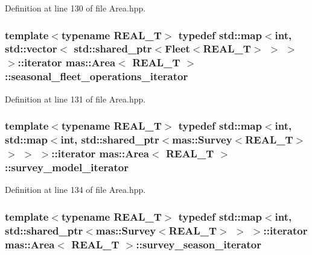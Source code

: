 Definition at line 130 of file Area.\-hpp.

\hypertarget{structmas_1_1_area_a93e43b48e01d6deb544629b9a16df074}{
\subsubsection[{seasonal\-\_\-fleet\-\_\-operations\-\_\-iterator}]{\setlength{\rightskip}{0pt plus 5cm}template$<$typename R\-E\-A\-L\-\_\-\-T$>$ typedef std\-::map$<$int, std\-::vector$<$ std\-::shared\-\_\-ptr$<${\bf Fleet}$<$R\-E\-A\-L\-\_\-\-T$>$ $>$ $>$ $>$\-::iterator {\bf mas\-::\-Area}$<$ R\-E\-A\-L\-\_\-\-T $>$\-::{\bf seasonal\-\_\-fleet\-\_\-operations\-\_\-iterator}}}\label{structmas_1_1_area_a93e43b48e01d6deb544629b9a16df074}


Definition at line 131 of file Area.\-hpp.

\hypertarget{structmas_1_1_area_ae1b22fac7afc3a1cd975eda651a4f635}{
\subsubsection[{survey\-\_\-model\-\_\-iterator}]{\setlength{\rightskip}{0pt plus 5cm}template$<$typename R\-E\-A\-L\-\_\-\-T$>$ typedef std\-::map$<$int, std\-::map$<$int, std\-::shared\-\_\-ptr$<${\bf mas\-::\-Survey}$<$R\-E\-A\-L\-\_\-\-T$>$ $>$ $>$ $>$\-::iterator {\bf mas\-::\-Area}$<$ R\-E\-A\-L\-\_\-\-T $>$\-::{\bf survey\-\_\-model\-\_\-iterator}}}\label{structmas_1_1_area_ae1b22fac7afc3a1cd975eda651a4f635}


Definition at line 134 of file Area.\-hpp.

\hypertarget{structmas_1_1_area_a406c0cf877a7c6b88586fa6da3108de2}{
\subsubsection[{survey\-\_\-season\-\_\-iterator}]{\setlength{\rightskip}{0pt plus 5cm}template$<$typename R\-E\-A\-L\-\_\-\-T$>$ typedef std\-::map$<$int, std\-::shared\-\_\-ptr$<${\bf mas\-::\-Survey}$<$R\-E\-A\-L\-\_\-\-T$>$ $>$ $>$\-::iterator {\bf mas\-::\-Area}$<$ R\-E\-A\-L\-\_\-\-T $>$\-::{\bf survey\-\_\-season\-\_\-iterator}}}\label{structmas_1_1_area_a406c0cf877a7c6b88586fa6da3108de2}


